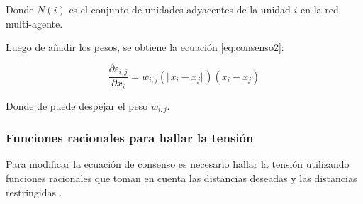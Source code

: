 Donde $N(i)$ es el conjunto de unidades adyacentes de la unidad $i$ en la red multi-agente.

Luego de añadir los pesos, se obtiene la ecuación \ref{eq:consenso2}:

\begin{equation}
	\frac{\partial \varepsilon_{i,j}}{\partial x_i} = w_{i,j}(\Vert x_i - x_j \Vert)(x_i - x_j)
	\label{eq:consenso2}
\end{equation}

Donde de puede despejar el peso $w_{i,j}$.

\subsubsection*{Funciones racionales para hallar la tensión}
Para modificar la ecuación de consenso es necesario hallar la tensión utilizando funciones racionales que toman en cuenta las distancias deseadas y las distancias restringidas \cite{PenaAM_2019_tesis}.


